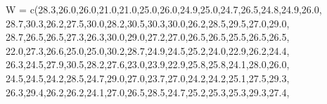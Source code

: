 \documentclass[
  letterpaper,
  DIV=11,
  numbers=noendperiod]{scrartcl}
\newenvironment{Shaded}{\begin{snugshade}}{\end{snugshade}}
\newcommand{\AttributeTok}[1]{\textcolor[rgb]{0.40,0.45,0.13}{#1}}
\newcommand{\FloatTok}[1]{\textcolor[rgb]{0.68,0.00,0.00}{#1}}
\newcommand{\FunctionTok}[1]{\textcolor[rgb]{0.28,0.35,0.67}{#1}}
\newcommand{\NormalTok}[1]{\textcolor[rgb]{0.00,0.23,0.31}{#1}}
\begin{document}
\begin{Shaded}
\begin{Highlighting}[]
  \AttributeTok{W =} \FunctionTok{c}\NormalTok{(}\FloatTok{28.3}\NormalTok{,}\FloatTok{26.0}\NormalTok{,}\FloatTok{26.0}\NormalTok{,}\FloatTok{21.0}\NormalTok{,}\FloatTok{21.0}\NormalTok{,}\FloatTok{25.0}\NormalTok{,}\FloatTok{26.0}\NormalTok{,}\FloatTok{24.9}\NormalTok{,}\FloatTok{25.0}\NormalTok{,}\FloatTok{24.7}\NormalTok{,}\FloatTok{26.5}\NormalTok{,}\FloatTok{24.8}\NormalTok{,}\FloatTok{24.9}\NormalTok{,}\FloatTok{26.0}\NormalTok{,}
        \FloatTok{28.7}\NormalTok{,}\FloatTok{30.3}\NormalTok{,}\FloatTok{26.2}\NormalTok{,}\FloatTok{27.5}\NormalTok{,}\FloatTok{30.0}\NormalTok{,}\FloatTok{28.2}\NormalTok{,}\FloatTok{30.5}\NormalTok{,}\FloatTok{30.3}\NormalTok{,}\FloatTok{30.0}\NormalTok{,}\FloatTok{26.2}\NormalTok{,}\FloatTok{28.5}\NormalTok{,}\FloatTok{29.5}\NormalTok{,}\FloatTok{27.0}\NormalTok{,}\FloatTok{29.0}\NormalTok{,}
        \FloatTok{28.7}\NormalTok{,}\FloatTok{26.5}\NormalTok{,}\FloatTok{26.5}\NormalTok{,}\FloatTok{27.3}\NormalTok{,}\FloatTok{26.3}\NormalTok{,}\FloatTok{30.0}\NormalTok{,}\FloatTok{29.0}\NormalTok{,}\FloatTok{27.2}\NormalTok{,}\FloatTok{27.0}\NormalTok{,}\FloatTok{26.5}\NormalTok{,}\FloatTok{26.5}\NormalTok{,}\FloatTok{25.5}\NormalTok{,}\FloatTok{26.5}\NormalTok{,}\FloatTok{26.5}\NormalTok{,}
        \FloatTok{22.0}\NormalTok{,}\FloatTok{27.3}\NormalTok{,}\FloatTok{26.6}\NormalTok{,}\FloatTok{25.0}\NormalTok{,}\FloatTok{25.0}\NormalTok{,}\FloatTok{30.2}\NormalTok{,}\FloatTok{28.7}\NormalTok{,}\FloatTok{24.9}\NormalTok{,}\FloatTok{24.5}\NormalTok{,}\FloatTok{25.2}\NormalTok{,}\FloatTok{24.0}\NormalTok{,}\FloatTok{22.9}\NormalTok{,}\FloatTok{26.2}\NormalTok{,}\FloatTok{24.4}\NormalTok{,}
        \FloatTok{26.3}\NormalTok{,}\FloatTok{24.5}\NormalTok{,}\FloatTok{27.9}\NormalTok{,}\FloatTok{30.5}\NormalTok{,}\FloatTok{28.2}\NormalTok{,}\FloatTok{27.6}\NormalTok{,}\FloatTok{23.0}\NormalTok{,}\FloatTok{23.9}\NormalTok{,}\FloatTok{22.9}\NormalTok{,}\FloatTok{25.8}\NormalTok{,}\FloatTok{25.8}\NormalTok{,}\FloatTok{24.1}\NormalTok{,}\FloatTok{28.0}\NormalTok{,}\FloatTok{26.0}\NormalTok{,}
        \FloatTok{24.5}\NormalTok{,}\FloatTok{24.5}\NormalTok{,}\FloatTok{24.2}\NormalTok{,}\FloatTok{28.5}\NormalTok{,}\FloatTok{24.7}\NormalTok{,}\FloatTok{29.0}\NormalTok{,}\FloatTok{27.0}\NormalTok{,}\FloatTok{23.7}\NormalTok{,}\FloatTok{27.0}\NormalTok{,}\FloatTok{24.2}\NormalTok{,}\FloatTok{24.2}\NormalTok{,}\FloatTok{25.1}\NormalTok{,}\FloatTok{27.5}\NormalTok{,}\FloatTok{29.3}\NormalTok{,}
        \FloatTok{26.3}\NormalTok{,}\FloatTok{29.4}\NormalTok{,}\FloatTok{26.2}\NormalTok{,}\FloatTok{26.2}\NormalTok{,}\FloatTok{24.1}\NormalTok{,}\FloatTok{27.0}\NormalTok{,}\FloatTok{26.5}\NormalTok{,}\FloatTok{28.5}\NormalTok{,}\FloatTok{24.7}\NormalTok{,}\FloatTok{25.2}\NormalTok{,}\FloatTok{25.3}\NormalTok{,}\FloatTok{25.3}\NormalTok{,}\FloatTok{29.3}\NormalTok{,}\FloatTok{27.4}\NormalTok{,}

\end{Highlighting}
\end{Shaded}
\end{document}
